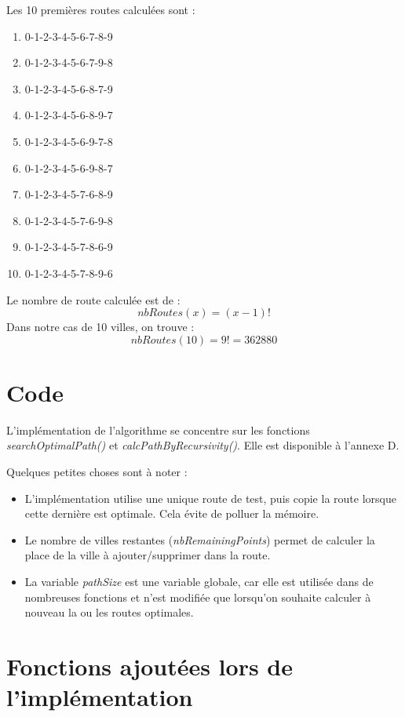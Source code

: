 \newpage

Les 10 premières routes calculées sont :
\begin{enumerate}
	\item 0-1-2-3-4-5-6-7-8-9
	\item 0-1-2-3-4-5-6-7-9-8
	\item 0-1-2-3-4-5-6-8-7-9
	\item 0-1-2-3-4-5-6-8-9-7
	\item 0-1-2-3-4-5-6-9-7-8
	\item 0-1-2-3-4-5-6-9-8-7
	\item 0-1-2-3-4-5-7-6-8-9
	\item 0-1-2-3-4-5-7-6-9-8
	\item 0-1-2-3-4-5-7-8-6-9
	\item 0-1-2-3-4-5-7-8-9-6
\end{enumerate}

\par\bigskip
Le nombre de route calculée est de :
\begin{equation}
   nbRoutes(x) = (x-1)!
\end{equation}
Dans notre cas de 10 villes, on trouve :
\begin{equation}
   nbRoutes(10) = 9! = 362880
\end{equation}

\section{Code}

L'implémentation de l'algorithme se concentre sur les fonctions \textit{searchOptimalPath()} et \textit{calcPathByRecursivity()}.
Elle est disponible à l'annexe D.

Quelques petites choses sont à noter :
\begin{itemize}
	\item L'implémentation utilise une unique route de test, puis copie la route lorsque cette dernière est optimale. Cela évite de polluer la mémoire.
	\item Le nombre de villes restantes (\textit{nbRemainingPoints}) permet de calculer la place de la ville à ajouter/supprimer dans la route.
	\item La variable \textit{pathSize} est une variable globale, car elle est utilisée dans de nombreuses fonctions et n'est modifiée que lorsqu'on souhaite calculer à nouveau la ou les routes optimales.
\end{itemize}

\section{Fonctions ajoutées lors de l'implémentation}

